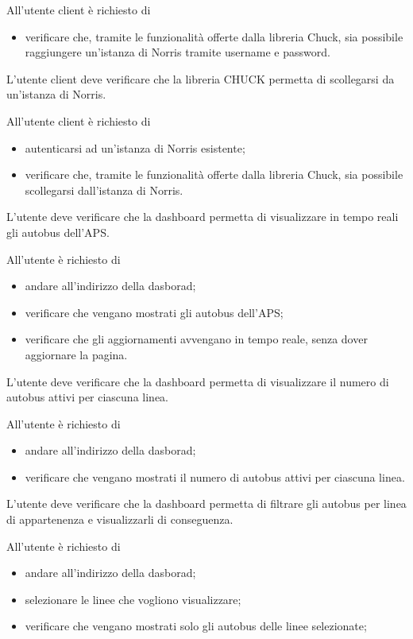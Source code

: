 		All'utente client è richiesto di
		\begin{itemize}
			\item verificare che, tramite le funzionalità offerte dalla libreria Chuck, sia possibile raggiungere un'istanza di Norris tramite username e password.
		\end{itemize}

	L'utente client deve verificare che la libreria CHUCK permetta di scollegarsi da un'istanza di Norris.

		All'utente client è richiesto di
		\begin{itemize}
			\item autenticarsi ad un'istanza di Norris esistente;
			\item verificare che, tramite le funzionalità offerte dalla libreria Chuck, sia possibile scollegarsi dall'istanza di Norris.
		\end{itemize}

	L'utente deve verificare che la dashboard permetta di visualizzare in tempo reali gli autobus dell'APS.

		All'utente è richiesto di
		\begin{itemize}
			\item andare all'indirizzo della dasborad;
			\item verificare che vengano mostrati gli autobus dell'APS;
			\item verificare che gli aggiornamenti avvengano in tempo reale, senza dover aggiornare la pagina.
		\end{itemize}

	L'utente deve verificare che la dashboard permetta di visualizzare il numero di autobus attivi per ciascuna linea.

		All'utente è richiesto di
		\begin{itemize}
			\item andare all'indirizzo della dasborad;
			\item verificare che vengano mostrati il numero di autobus attivi per ciascuna linea.
		\end{itemize}

	L'utente deve verificare che la dashboard permetta di filtrare gli autobus per linea di appartenenza e visualizzarli di conseguenza.

		All'utente è richiesto di
		\begin{itemize}
			\item andare all'indirizzo della dasborad;
			\item selezionare le linee che vogliono visualizzare;
			\item verificare che vengano mostrati solo gli autobus delle linee selezionate;
		\end{itemize}

